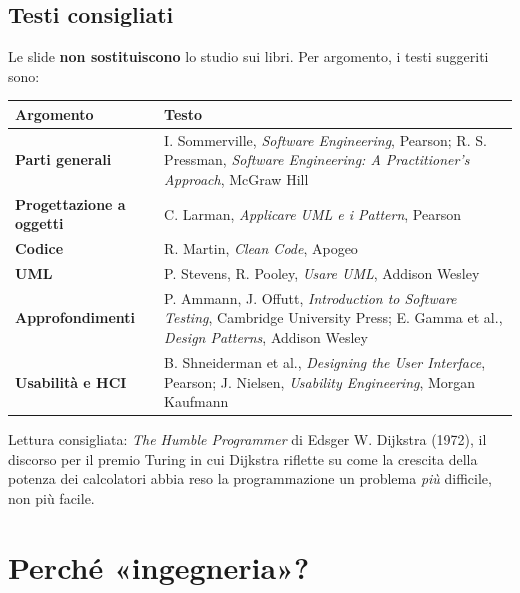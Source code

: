 
\subsection{Testi consigliati}

Le slide \textbf{non sostituiscono} lo studio sui libri. Per argomento, i testi suggeriti sono:

\begin{table}[H]
\centering
\renewcommand{\arraystretch}{1.3}
\begin{tabularx}{\textwidth}{>{\bfseries}P{3.8cm} L}
\toprule
Argomento & Testo \\
\midrule
Parti generali & I. Sommerville, \textit{Software Engineering}, Pearson; R. S. Pressman, \textit{Software Engineering: A Practitioner's Approach}, McGraw Hill \\
Progettazione a oggetti & C. Larman, \textit{Applicare UML e i Pattern}, Pearson \\
Codice & R. Martin, \textit{Clean Code}, Apogeo \\
UML & P. Stevens, R. Pooley, \textit{Usare UML}, Addison Wesley \\
Approfondimenti & P. Ammann, J. Offutt, \textit{Introduction to Software Testing}, Cambridge University Press; E. Gamma et al., \textit{Design Patterns}, Addison Wesley \\
Usabilità e HCI & B. Shneiderman et al., \textit{Designing the User Interface}, Pearson; J. Nielsen, \textit{Usability Engineering}, Morgan Kaufmann \\
\bottomrule
\end{tabularx}
\end{table}

Lettura consigliata: \textit{The Humble Programmer} di Edsger W. Dijkstra (1972), il discorso per il premio Turing
in cui Dijkstra riflette su come la crescita della potenza dei calcolatori abbia reso la programmazione
un problema \textit{più} difficile, non più facile.

\section{Perché «ingegneria»?}

